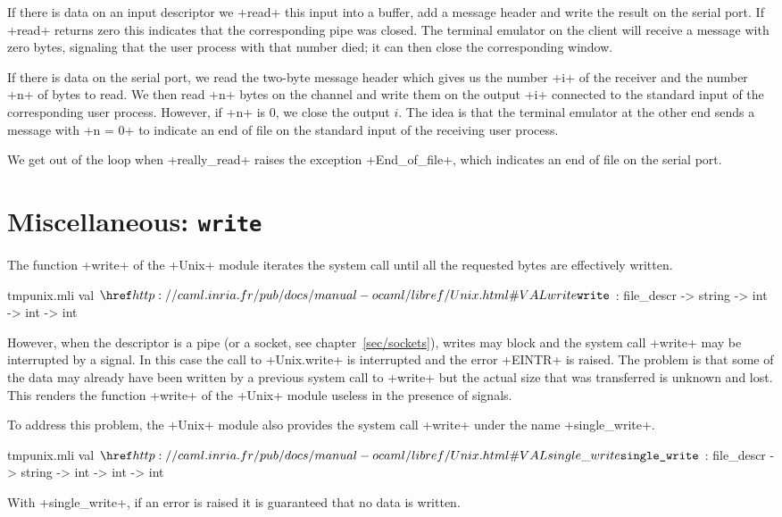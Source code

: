 \begin{example}
If there is data on an input descriptor we \ml+read+ this input into a
buffer, add a message header and write the result on the serial
port. If \ml+read+ returns zero this indicates that the corresponding
pipe was closed. The terminal emulator on the client will receive a
message with zero bytes, signaling that the user process
with that number died; it can then close the corresponding window.

If there is data on the serial port, we read the two-byte message
header which gives us the number \ml+i+ of the receiver and the number
\ml+n+ of bytes to read. We then read \ml+n+ bytes on the channel and
write them on the output \ml+i+ connected to the standard input of the
corresponding user process. However, if \ml+n+ is 0, we close the
output $i$. The idea is that the terminal emulator at the other end
sends a message with \ml+n = 0+ to indicate an end of file on the
standard input of the receiving user process.

We get out of the loop when \ml+really_read+ raises the exception
\ml+End_of_file+, which indicates an end of file on the
serial port.
\end{example}

\section{\label{single_write}Miscellaneous: \texttt{write}}

The function \ml+write+ of the \ml+Unix+ module iterates the system call
 until all the requested bytes are effectively written.
\begin{listingcodefile}{tmpunix.mli}
val $\libvalue{Unix}{write}$ : file_descr -> string -> int -> int -> int
\end{listingcodefile}
% 
However, when the descriptor is a pipe (or a socket, see
chapter~\ref{sec/sockets}), writes may block and the system call
\ml+write+ may be interrupted by a signal. In this case the {\ocaml}
call to \ml+Unix.write+ is interrupted and the error \ml+EINTR+ is
raised. The problem is that some of the data may already have been
written by a previous system call to \ml+write+ but the actual size
that was transferred is unknown and lost. This renders the function 
\ml+write+ of the \ml+Unix+ module useless in the presence of signals.
 
To address this problem, the \ml+Unix+ module also provides the
 system call \ml+write+ under the name
\ml+single_write+. 
\begin{listingcodefile}{tmpunix.mli}
val $\libvalue{Unix}{single\_write}$ : file_descr -> string -> int -> int -> int
\end{listingcodefile}
With \ml+single_write+, if an error is raised it is guaranteed that no
data is written.

